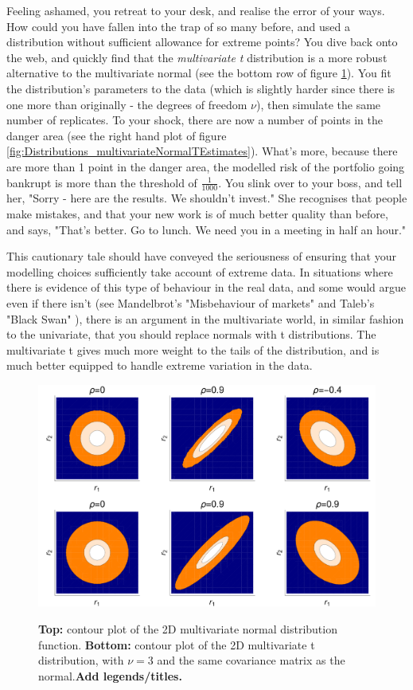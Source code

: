 \documentclass[11pt,fullpage]{book}
\begin{document}
Feeling ashamed, you retreat to your desk, and realise the error of your ways. How could you have fallen into the trap of so many before, and used a distribution without sufficient allowance for extreme points? You dive back onto the web, and quickly find that the \textit{multivariate t} distribution is a more robust alternative to the multivariate normal (see the bottom row of figure \ref{fig:Distributions_multivariateNormalT}). You fit the distribution's parameters to the data (which is slightly harder since there is one more than originally - the degrees of freedom $\nu$), then simulate the same number of replicates. To your shock, there are now a number of points in the danger area (see the right hand plot of figure \ref{fig:Distributions_multivariateNormalTEstimates}). What's more, because there are more than 1 point in the danger area, the modelled risk of the portfolio going bankrupt is more than the threshold of $\frac{1}{1000}$. You slink over to your boss, and tell her, "Sorry - here are the results. We shouldn't invest." She recognises that people make mistakes, and that your new work is of much better quality than before, and says, "That's better. Go to lunch. We need you in a meeting in half an hour."

This cautionary tale should have conveyed the seriousness of ensuring that your modelling choices sufficiently take account of extreme data. In situations where there is evidence of this type of behaviour in the real data, and some would argue even if there isn't (see Mandelbrot's "Misbehaviour of markets" \cite{mandelbrot2008misbehaviour} and Taleb's "Black Swan" \cite{taleb2010black}), there is an argument in the multivariate world, in similar fashion to the univariate, that you should replace normals with t distributions. The multivariate t gives much more weight to the tails of the distribution, and is much better equipped to handle extreme variation in the data.

\begin{figure}
\centering
\scalebox{0.3} 
{\includegraphics{Distributions_multivariateNormalT.pdf}}
\caption{\textbf{Top:} contour plot of the 2D multivariate normal distribution function. \textbf{Bottom:} contour plot of the 2D multivariate t distribution, with $\nu=3$ and the same covariance matrix as the normal.\textbf{Add legends/titles.}}\label{fig:Distributions_multivariateNormalT}
\end{figure}
\end{document}
